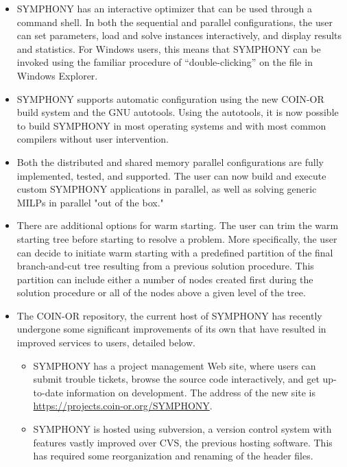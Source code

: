 \begin{itemize}

\item SYMPHONY has an interactive optimizer that can be used through a
command shell. In both the sequential and parallel configurations, the user
can set parameters, load and solve instances interactively, and display
results and statistics. For Windows users, this means that SYMPHONY can be
invoked using the familiar procedure of ``double-clicking'' on the
 file in Windows Explorer.

\item SYMPHONY supports automatic configuration using the new COIN-OR
build system and the GNU autotools. Using the autotools, it is now possible to
build SYMPHONY in most operating systems and with most common compilers
without user intervention.

\item Both the distributed and shared memory parallel configurations are fully
 implemented, tested, and supported. The user can now build and execute custom
 SYMPHONY applications in parallel, as well as solving generic MILPs in
 parallel "out of the box."

\item There are additional options for warm starting. The user can trim the
warm starting tree before starting to resolve a problem. More specifically,
the user can decide to initiate warm starting with a predefined partition of
the final branch-and-cut tree resulting from a previous solution procedure.
This partition can include either a number of nodes created first during the
solution procedure or all of the nodes above a given level of the tree.

\item The COIN-OR repository, the current host of SYMPHONY has
  recently undergone some significant improvements of its own that have
  resulted in improved services to users, detailed below. 

\begin{itemize}

\item SYMPHONY has a project management Web site, where users can submit
  trouble tickets, browse the source code interactively, and get up-to-date
  information on development. The address of the new site is
  \url{https://projects.coin-or.org/SYMPHONY}.

\item SYMPHONY is hosted using subversion, a version control system with
  features vastly improved over CVS, the previous hosting software. This has
  required some reorganization and renaming of the header files.


\end{itemize}
\end{itemize}
